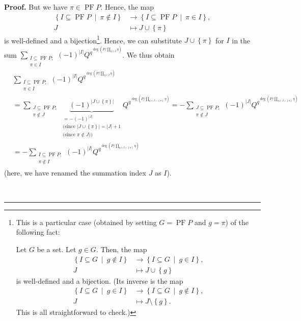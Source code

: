 \documentclass[numbers=enddot,12pt,final,onecolumn,notitlepage]{scrartcl}%
\theoremstyle{definition}
\newenvironment{proof}[1][Proof]{\noindent\textbf{#1.} }{\ \rule{0.5em}{0.5em}}
\let\sumnonlimits\sum
\let\prodnonlimits\prod
\renewcommand{\sum}{\sumnonlimits\limits}
\renewcommand{\prod}{\prodnonlimits\limits}
\begin{document}
\begin{proof}
But we have $\pi\in\operatorname*{PF}P$. Hence, the map%
\begin{align*}
\left\{  I\subseteq\operatorname*{PF}P\ \mid\ \pi\notin I\right\}   &
\rightarrow\left\{  I\subseteq\operatorname*{PF}P\ \mid\ \pi\in I\right\}  ,\\
J  &  \mapsto J\cup\left\{  \pi\right\}
\end{align*}
is well-defined and a bijection\footnote{This is a particular case (obtained
by setting $G=\operatorname*{PF}P$ and $g=\pi$) of the following fact:
\par
Let $G$ be a set. Let $g\in G$. Then, the map%
\begin{align*}
\left\{  I\subseteq G\ \mid\ g\notin I\right\}   &  \rightarrow\left\{
I\subseteq G\ \mid\ g\in I\right\}  ,\\
J  &  \mapsto J\cup\left\{  g\right\}
\end{align*}
is well-defined and a bijection. (Its inverse is the map
\begin{align*}
\left\{  I\subseteq G\ \mid\ g\in I\right\}   &  \rightarrow\left\{
I\subseteq G\ \mid\ g\notin I\right\}  ,\\
J  &  \mapsto J\setminus\left\{  g\right\}  .
\end{align*}
This is all straightforward to check.)}. Hence, we can substitute
$J\cup\left\{  \pi\right\}  $ for $I$ in the sum $\sum_{\substack{I\subseteq
\operatorname*{PF}P;\\\pi\in I}}\left(  -1\right)  ^{\left\vert I\right\vert
}Q^{q^{\deg\left(  P/\prod_{\eta\in I}\eta\right)  }}$. We thus obtain%
\begin{align}
&  \sum_{\substack{I\subseteq\operatorname*{PF}P;\\\pi\in I}}\left(
-1\right)  ^{\left\vert I\right\vert }Q^{q^{\deg\left(  P/\prod_{\eta\in
I}\eta\right)  }}\nonumber\\
&  =\sum_{\substack{J\subseteq\operatorname*{PF}P;\\\pi\notin J}%
}\underbrace{\left(  -1\right)  ^{\left\vert J\cup\left\{  \pi\right\}
\right\vert }}_{\substack{=-\left(  -1\right)  ^{\left\vert J\right\vert
}\\\text{(since }\left\vert J\cup\left\{  \pi\right\}  \right\vert =\left\vert
J\right\vert +1\\\text{(since }\pi\notin J\text{))}}}Q^{q^{\deg\left(
P/\prod_{\eta\in J\cup\left\{  \pi\right\}  }\eta\right)  }}=-\sum
_{\substack{J\subseteq\operatorname*{PF}P;\\\pi\notin J}}\left(  -1\right)
^{\left\vert J\right\vert }Q^{q^{\deg\left(  P/\prod_{\eta\in J\cup\left\{
\pi\right\}  }\eta\right)  }}\nonumber\\
&  =-\sum_{\substack{I\subseteq\operatorname*{PF}P;\\\pi\notin I}}\left(
-1\right)  ^{\left\vert I\right\vert }Q^{q^{\deg\left(  P/\prod_{\eta\in
I\cup\left\{  \pi\right\}  }\eta\right)  }}
\label{pf.cor.F.gW.example1.levent.2nd.obs6.pf.3}%
\end{align}
(here, we have renamed the summation index $J$ as $I$).


\end{proof}
\end{document}
